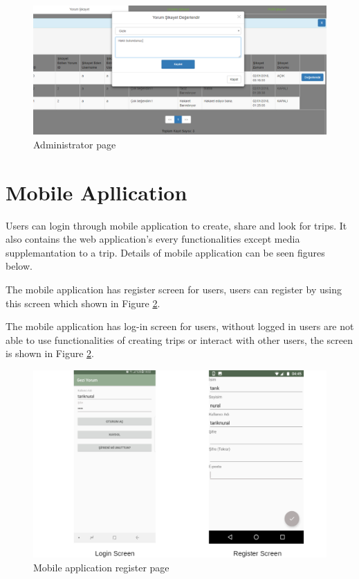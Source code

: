 \begin{figure}[!htbp]
\centering
\includegraphics[width=\textwidth]{projectChapters/images/admin2.png}
\caption{Administrator page}
\label{fig:admin2}
\end{figure}

\newpage


\section{Mobile Apllication}

Users can login through mobile application to create, share and look for trips. It also contains the web application's every functionalities except media supplemantation to a trip. Details of mobile application can be seen figures below.

The mobile application has register screen for users, users can register by using this screen which shown in Figure \ref{fig:phoneRegister}.

The mobile application has log-in screen for users, without logged in users are not able to use functionalities of creating trips or interact with other users, the screen is shown in Figure \ref{fig:phoneRegister}.

\begin{figure}[!htbp]
\centering
\includegraphics[width=\textwidth]{projectChapters/images/phoneLogin.png}
\caption{Mobile application register page}
\label{fig:phoneRegister}
\end{figure}

